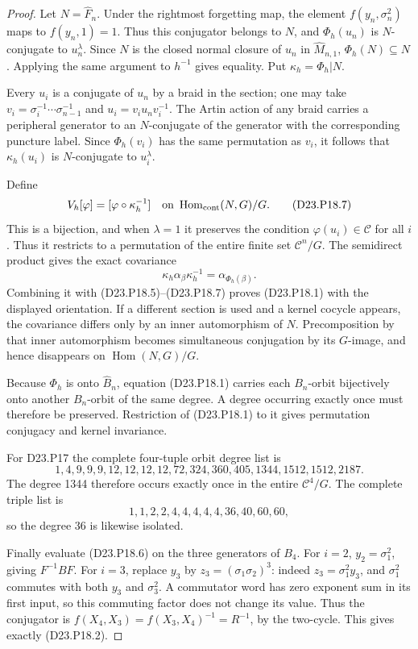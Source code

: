 \begin{proof}
Let $N=\widehat F_n$. Under the rightmost forgetting map,
the element $f(y_n,\sigma_n^2)$ maps to $f(y_n,1)=1$.
Thus this conjugator belongs to $N$, and
$\Phi_h(u_n)$ is $N$-conjugate to $u_n^\lambda$.
Since $N$ is the closed normal closure of $u_n$ in
$\widehat M_{n,1}$, $\Phi_h(N)\subseteq N$. Applying the same
argument to $h^{-1}$ gives equality. Put
$\kappa_h=\Phi_h|N$.

Every $u_i$ is a conjugate of $u_n$ by a braid in the section;
one may take $v_i=\sigma_i^{-1}\cdots\sigma_{n-1}^{-1}$ and
$u_i=v_i u_n v_i^{-1}$. The Artin action of any braid carries
a peripheral generator to an $N$-conjugate of the generator
with the corresponding puncture label. Since $\Phi_h(v_i)$
has the same permutation as $v_i$, it follows that
$\kappa_h(u_i)$ is $N$-conjugate to $u_i^\lambda$.

Define
\[
 V_h[\varphi]=[\varphi\circ\kappa_h^{-1}]
 \quad\text{on }\operatorname{Hom}_{\rm cont}(N,G)/G.
 \tag{D23.P18.7}
\]
This is a bijection, and when $\lambda=1$ it preserves the
condition $\varphi(u_i)\in\mathcal C$ for all $i$. Thus it
restricts to a permutation of the entire finite set
$\mathcal C^n/G$.
The semidirect product gives the exact covariance
\[
 \kappa_h\alpha_\beta\kappa_h^{-1}
       =\alpha_{\Phi_h(\beta)}.
\]
Combining it with (D23.P18.5)--(D23.P18.7) proves (D23.P18.1)
with the displayed orientation. If a different section is
used and a kernel cocycle appears, the covariance differs
only by an inner automorphism of $N$. Precomposition by that
inner automorphism becomes simultaneous conjugation by its
$G$-image, and hence disappears on $\operatorname{Hom}(N,G)/G$.

Because $\Phi_h$ is onto $\widehat B_n$, equation
(D23.P18.1) carries each $B_n$-orbit bijectively onto another
$B_n$-orbit of the same degree. A degree occurring exactly
once must therefore be preserved. Restriction of (D23.P18.1)
to it gives permutation conjugacy and kernel invariance.

For D23.P17 the complete four-tuple orbit degree list is
\[
 1,4,9,9,9,12,12,12,12,72,324,360,405,
 1344,1512,1512,2187.
\]
The degree 1344 therefore occurs exactly once in the entire
$\mathcal C^4/G$. The complete triple list is
\[
 1,1,2,2,4,4,4,4,4,36,40,60,60,
\]
so the degree 36 is likewise isolated.

Finally evaluate (D23.P18.6) on the three generators of
$B_4$. For $i=2$, $y_2=\sigma_1^2$, giving $F^{-1}BF$.
For $i=3$, replace $y_3$ by $z_3=(\sigma_1\sigma_2)^3$:
indeed $z_3=\sigma_1^2y_3$, and $\sigma_1^2$ commutes with
both $y_3$ and $\sigma_3^2$. A commutator word has zero
exponent sum in its first input, so this commuting factor
does not change its value. Thus the conjugator is
$f(X_4,X_3)=f(X_3,X_4)^{-1}=R^{-1}$, by the two-cycle.
This gives exactly (D23.P18.2).
\end{proof}

